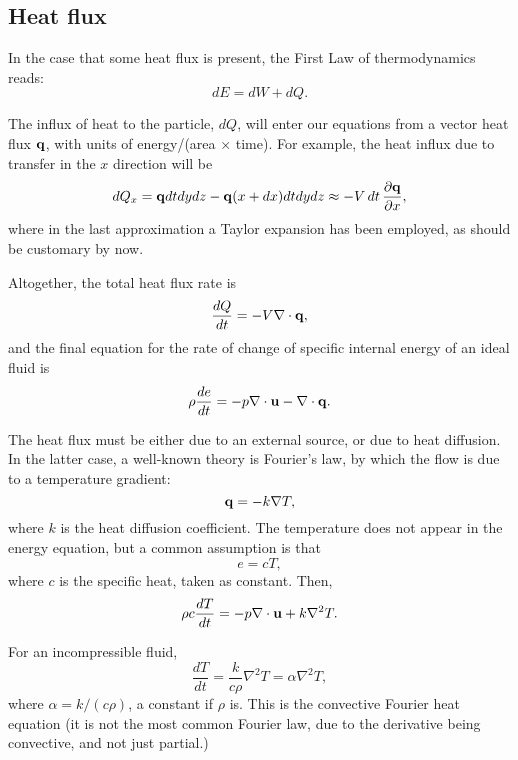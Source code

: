 \subsection{Heat flux}

In the case that some heat flux is present, the First Law of
thermodynamics reads:
\[
dE=dW + dQ .
\]

The influx of heat to the particle, $dQ$, will enter our equations
from a vector heat flux $\mathbf{q}$, with units of energy/(area $\times$
time). For example, the heat influx due to transfer in the $x$ direction
will be
\[
dQ_x= \mathbf{q} dt dy dz - \mathbf{q}(x+dx) dt dy dz \approx
      - V \, dt \, \frac{\partial\mathbf{q}}{\partial x},
\]
where in the last approximation a Taylor expansion has been employed,
as should be customary by now.

Altogether, the total heat flux rate is
\[
\frac{dQ}{dt} = -V \nabla\cdot \mathbf{q},
\]
and the final equation for the rate of change of specific internal
energy of an ideal fluid is
\begin{equation}
  \label{eq:Euler_energy_w_q}
  \rho \frac{de}{dt}  = -  p \nabla\cdot \mathbf{u}  - \nabla\cdot \mathbf{q} .
\end{equation}


The heat flux must be either due to an external source, or due to heat
diffusion. In the latter case, a well-known theory is Fourier's law, by
which the flow is due to a temperature gradient:
\[
\mathbf{q}=- k \nabla T ,
\]
where $k$ is the heat diffusion coefficient. The temperature does not
appear in the energy equation, but a common assumption is that
\[
e = c T ,
\]
where $c$ is the specific heat, taken as constant. Then,
\[
\rho  c \frac{d T }{dt}  = - p \nabla\cdot \mathbf{u}  + k \nabla^2 T .
\]

For an incompressible fluid,
\[
 \frac{d T }{dt}  = \frac{ k }{ c \rho} \nabla^2 T  = \alpha \nabla^2 T ,
\]
where $\alpha = k / (c \rho)$, a constant if $\rho$ is. This is the
convective Fourier heat equation (it is not the most common Fourier
law, due to the derivative being convective, and not just partial.)

